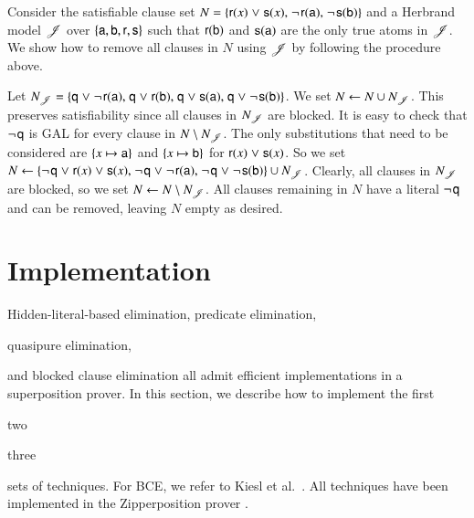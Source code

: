 \begin{exa}
   Consider the satisfiable clause set $N = \{{\mathsf{r}(x)} \mathrel{\lor}
   {\mathsf{s}(x)}{,}\; \neg{\kern.2ex \mathsf{r}(\mathsf{a})}{,}\allowbreak\;
   \neg{\kern.2ex \mathsf{s}(\mathsf{b})}\}$ and a Herbrand model $\mathscr{J}$ over
   $\{\mathsf{a}, \mathsf{b}, \mathsf{r}, \mathsf{s}\}$ such that
   $\mathsf{r}(\mathsf{b})$ and $\mathsf{s}(\mathsf{a})$ are the only true atoms in
   $\mathscr{J}$. We show how to remove all clauses in $N$ using $\mathscr{J}$ 
   by following the procedure above.

   Let $N_{\mathscr{J}} = \{ \mathsf{q} \mathrel{\lor} \neg{\kern.2ex \mathsf{r}(\mathsf{a})}{,}\; \mathsf{q}
   \mathrel{\lor} {\mathsf{r}(\mathsf{b})}{,}\; \mathsf{q} \mathrel{\lor}
   {\mathsf{s}(\mathsf{a})}{,}\; \mathsf{q} \mathrel{\lor} \neg{\kern.2ex \mathsf{s}(\mathsf{b})}
   \}$. We set $N \gets N \cup N_{\mathscr{J}}$. This preserves satisfiability
   since all clauses in $N_{\mathscr{J}}$ are blocked. It is easy to check that
   $\neg{\kern.2ex \mathsf{q}}$ is GAL for every clause in $N \setminus N_{\mathscr{J}}$. The
   only substitutions that need to be considered are $\{x \mapsto \mathsf{a} \}$ and $\{x \mapsto
   \mathsf{b} \}$ for ${\mathsf{r}(x)} \mathrel{\lor} {\mathsf{s}(x)}$.
   So we set $N \gets \{\neg{\kern.2ex \mathsf{q}} \mathrel{\lor} {\mathsf{r}(x)} \mathrel{\lor} {\mathsf{s}(x)}{,}\;
   \neg{\kern.2ex \mathsf{q}} \mathrel{\lor} \neg{\kern.2ex \mathsf{r}(\mathsf{a})}{,}\;
   \neg{\kern.2ex \mathsf{q}} \mathrel{\lor} \neg{\kern.2ex \mathsf{s}(\mathsf{b})}\} \cup N_{\mathscr{J}}$.
   Clearly, all clauses in $N_{\mathscr{J}}$ are blocked, so we set $N \gets N \setminus
   N_{\mathscr{J}}$. All clauses remaining in $N$ have a literal $\neg{\kern.2ex \mathsf{q}}$
   and can be removed, leaving $N$ empty as desired.
\end{exa}

\section{Implementation}
\label{sec:satfol:implementation}

\newcommand{\impmap}{\textit{Imp}}

Hidden-literal-based elimination, predicate elimination, \begin{qle}quasipure
elimination, \end{qle}and blocked clause
elimination all admit efficient implementations in a superposition
prover. In this section, we describe how to implement the first
\begin{noqle}two\end{noqle}\begin{qle}three\end{qle} sets of
techniques. For BCE, we refer to Kiesl et al.\ \cite{ksstb-2017-blockedfol}.
All techniques have been implemented in the Zipperposition prover
\cite{sc-supind-17}.

